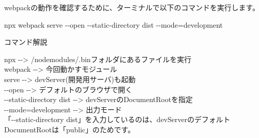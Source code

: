 {}
webpackの動作を確認するために、ターミナルで以下のコマンドを実行します。

npx webpack serve {-}{-}open {-}{-}static{-}directory dist {-}{-}mode=development

\begin{starternote}[]{コマンド解説}

npx {-}{-}\textgreater{} /node\textunderscore{}modules/.binフォルダにあるファイルを実行\\[0pt]
webpack {-}{-}\textgreater{} 今回動かすモジュール\\[0pt]
serve {-}{-}\textgreater{} devServer(開発用サーバ)も起動\\[0pt]
{-}{-}open {-}{-}\textgreater{} デフォルトのブラウザで開く\\[0pt]
{-}{-}static{-}directory dist {-}{-}\textgreater{} devServerのDocumentRootを指定\\[0pt]
{-}{-}mode=development {-}{-}\textgreater{} 出力モード\\[0pt]

「{-}{-}static{-}directory dist」を入力しているのは、devServerのデフォルトDocumentRootは「public」のためです。

\end{starternote}
\def\startercodeblockfontsize{}
